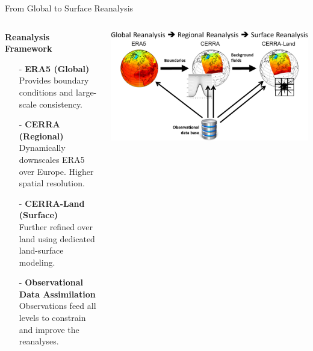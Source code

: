 \documentclass[footline=authortitle]{beamer}
\begin{document}
\begin{frame}{From Global to Surface Reanalysis}
\tiny
\begin{columns}
    \begin{column}{0.50\textwidth}
        \textbf{Reanalysis Framework}
        \vspace{0.3em}
        \begin{itemize}
            \item[-] \textbf{ERA5 (Global)}\\
        Provides boundary conditions and large-scale consistency.\\[0.5em]
        \item [-] \textbf{CERRA (Regional)}\\
        Dynamically downscales ERA5 over Europe. Higher spatial resolution.\\[0.5em]
        \item [-] \textbf{CERRA-Land (Surface)}\\
        Further refined over land using dedicated land-surface modeling.\\[0.5em]
        \item[-]  \textbf{Observational Data Assimilation}\\
        Observations feed all levels to constrain and improve the reanalyses.
        \end{itemize}
    \end{column}

    \begin{column}{0.48\textwidth}
        \centering
        \includegraphics[width=\linewidth]{images/wind_speed.png}
    \end{column}
\end{columns}
\end{frame}
\end{document}
